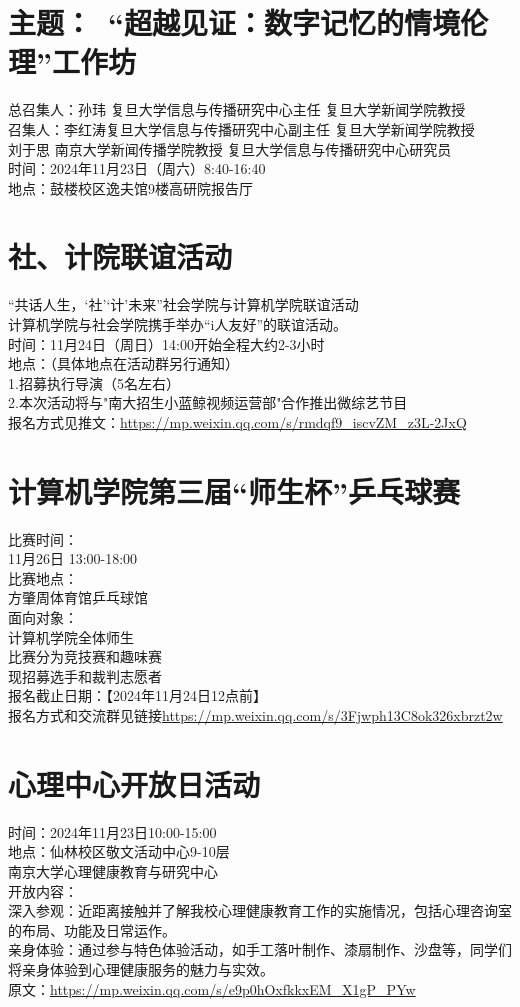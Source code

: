 \documentclass[letterpaper, 12pt]{article}
\begin{document}
\begin{multicols}{2}
\section{主题： “超越见证：数字记忆的情境伦理”工作坊}
总召集人：孙玮 复旦大学信息与传播研究中心主任 复旦大学新闻学院教授\\
召集人：李红涛复旦大学信息与传播研究中心副主任 复旦大学新闻学院教授\\
       刘于思 南京大学新闻传播学院教授 复旦大学信息与传播研究中心研究员\\
时间：2024年11月23日（周六）8:40-16:40\\
地点：鼓楼校区逸夫馆9楼高研院报告厅\\
\section{社、计院联谊活动}
 “共话人生，‘社’‘计’未来”社会学院与计算机学院联谊活动\\
计算机学院与社会学院携手举办“i人友好”的联谊活动。\\
时间：11月24日（周日）14:00开始全程大约2-3小时\\
地点：（具体地点在活动群另行通知）\\
1.招募执行导演（5名左右）\\
2.本次活动将与"南大招生小蓝鲸视频运营部"合作推出微综艺节目\\
报名方式见推文：\url{https://mp.weixin.qq.com/s/rmdqf9_iscvZM_z3L-2JxQ}
\section{计算机学院第三届“师生杯”乒乓球赛}
比赛时间：\\
11月26日 13:00-18:00\\
比赛地点：\\
方肇周体育馆乒乓球馆\\
面向对象：\\
计算机学院全体师生\\
比赛分为竞技赛和趣味赛\\
现招募选手和裁判志愿者\\
报名截止日期：【2024年11月24日12点前】\\
报名方式和交流群见链接\url{https://mp.weixin.qq.com/s/3Fjwph13C8ok326xbrzt2w}

\section{心理中心开放日活动}
时间：2024年11月23日10:00-15:00\\
地点：仙林校区敬文活动中心9-10层\\
南京大学心理健康教育与研究中心\\
开放内容：\\
深入参观：近距离接触并了解我校心理健康教育工作的实施情况，包括心理咨询室的布局、功能及日常运作。\\
亲身体验：通过参与特色体验活动，如手工落叶制作、漆扇制作、沙盘等，同学们将亲身体验到心理健康服务的魅力与实效。\\
原文：\url{https://mp.weixin.qq.com/s/e9p0hOxfkkxEM_X1gP_PYw}


\end{multicols}
\end{document}
